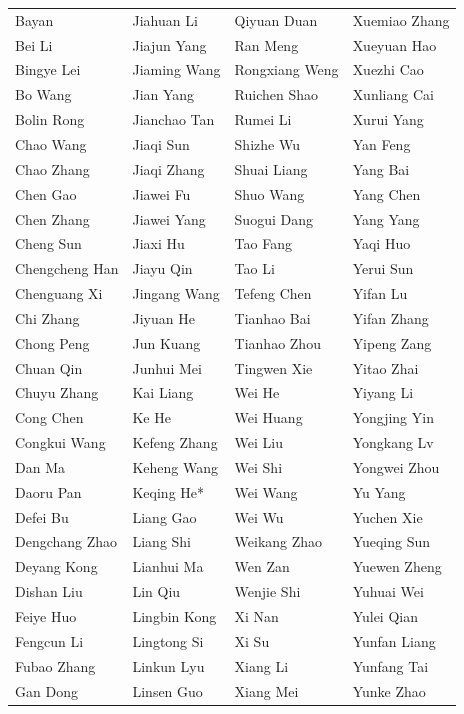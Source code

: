 \documentclass{article}
\begin{document}
\begin{tabular}{p{}p{}p{}p{}}
Bayan & Jiahuan Li & Qiyuan Duan & Xuemiao Zhang \\
Bei Li & Jiajun Yang & Ran Meng & Xueyuan Hao \\
Bingye Lei & Jiaming Wang & Rongxiang Weng & Xuezhi Cao \\
Bo Wang & Jian Yang & Ruichen Shao & Xunliang Cai \\
Bolin Rong & Jianchao Tan & Rumei Li & Xurui Yang \\
Chao Wang & Jiaqi Sun & Shizhe Wu & Yan Feng \\
Chao Zhang & Jiaqi Zhang & Shuai Liang & Yang Bai \\
Chen Gao & Jiawei Fu & Shuo Wang & Yang Chen \\
Chen Zhang & Jiawei Yang & Suogui Dang & Yang Yang \\
Cheng Sun & Jiaxi Hu & Tao Fang & Yaqi Huo \\
Chengcheng Han & Jiayu Qin & Tao Li & Yerui Sun \\
Chenguang Xi & Jingang Wang & Tefeng Chen & Yifan Lu \\
Chi Zhang & Jiyuan He & Tianhao Bai & Yifan Zhang \\
Chong Peng & Jun Kuang & Tianhao Zhou & Yipeng Zang \\
Chuan Qin & Junhui Mei & Tingwen Xie & Yitao Zhai \\
Chuyu Zhang & Kai Liang & Wei He & Yiyang Li \\
Cong Chen & Ke He & Wei Huang & Yongjing Yin \\
Congkui Wang & Kefeng Zhang & Wei Liu & Yongkang Lv \\
Dan Ma & Keheng Wang & Wei Shi & Yongwei Zhou \\
Daoru Pan & Keqing He* & Wei Wang & Yu Yang \\
Defei Bu & Liang Gao & Wei Wu & Yuchen Xie \\
Dengchang Zhao & Liang Shi & Weikang Zhao & Yueqing Sun \\
Deyang Kong & Lianhui Ma & Wen Zan & Yuewen Zheng \\
Dishan Liu & Lin Qiu & Wenjie Shi & Yuhuai Wei \\
Feiye Huo & Lingbin Kong & Xi Nan & Yulei Qian \\
Fengcun Li & Lingtong Si & Xi Su & Yunfan Liang \\
Fubao Zhang & Linkun Lyu & Xiang Li & Yunfang Tai \\
Gan Dong & Linsen Guo & Xiang Mei & Yunke Zhao \\

\end{tabular}
\end{document}
